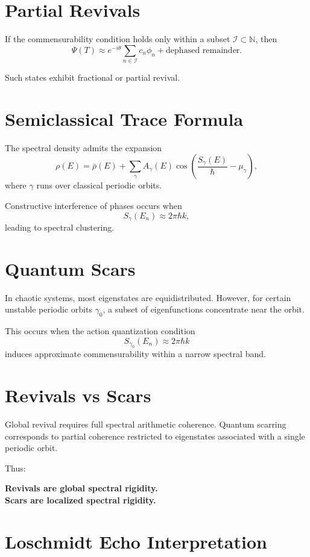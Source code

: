 \documentclass[11pt]{article}
\begin{document}
\section{Partial Revivals}

If the commensurability condition holds only within a subset $\mathcal{I}\subset \mathbb{N}$, then
\[
\Psi(T) \approx e^{-i\theta}\sum_{n\in\mathcal{I}} c_n\phi_n
+ \text{dephased remainder}.
\]

Such states exhibit fractional or partial revival.

\section{Semiclassical Trace Formula}

The spectral density admits the expansion
\[
\rho(E)=\bar{\rho}(E)
+
\sum_\gamma
A_\gamma(E)
\cos\!\left(\frac{S_\gamma(E)}{\hbar}-\mu_\gamma\right),
\]
where $\gamma$ runs over classical periodic orbits.

Constructive interference of phases occurs when
\[
S_\gamma(E_n)\approx 2\pi\hbar k,
\]
leading to spectral clustering.

\section{Quantum Scars}

In chaotic systems, most eigenstates are equidistributed.
However, for certain unstable periodic orbits $\gamma_0$, 
a subset of eigenfunctions concentrate near the orbit.

This occurs when the action quantization condition
\[
S_{\gamma_0}(E_n)\approx 2\pi\hbar k
\]
induces approximate commensurability within a narrow spectral band.

\section{Revivals vs Scars}

Global revival requires full spectral arithmetic coherence.
Quantum scarring corresponds to partial coherence restricted to 
eigenstates associated with a single periodic orbit.

Thus:
\begin{center}
\textbf{Revivals are global spectral rigidity.} \\
\textbf{Scars are localized spectral rigidity.}
\end{center}

\section{Loschmidt Echo Interpretation}
\end{document}
